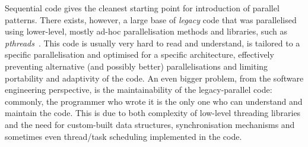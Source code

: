 






  




  

Sequential code gives the cleanest starting point for introduction of parallel patterns. There exists, however, a large base of \emph{legacy} code  that was parallelised using lower-level, mostly ad-hoc parallelisation methods and libraries, such as \emph{pthreads}~\cite{10.5555/263953}. This code is usually very hard to read and understand, is tailored to a specific parallelisation and optimised for a specific architecture, effectively preventing alternative (and possibly better) parallelisations and limiting portability and adaptivity of the code. An even bigger problem, from the software engineering perspective, is the maintainability of the legacy-parallel code: commonly, the programmer who wrote it is the only one who can understand and maintain the code. This is due to both complexity of low-level threading libraries and the need for custom-built data structures, synchronisation mechanisms and sometimes even thread/task scheduling implemented in the code. 
  
